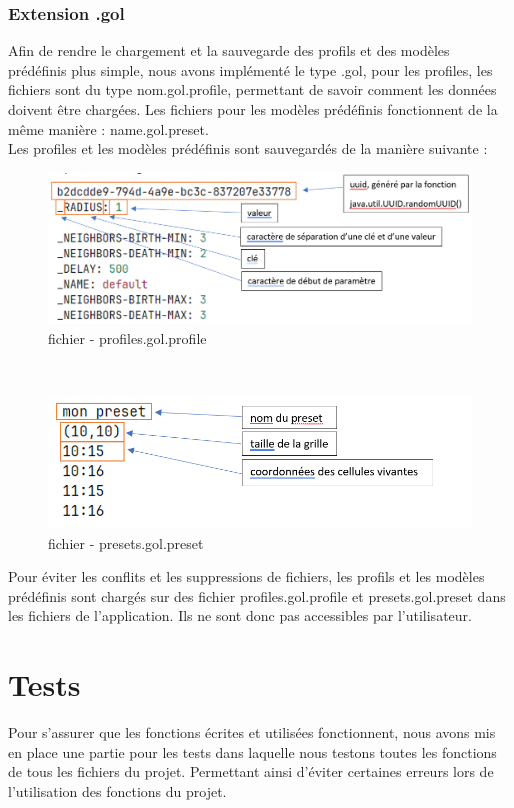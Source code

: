 \documentclass[12pt]{article}
\begin{document}
			\subsubsection{Extension .gol}
			Afin de rendre le chargement et la sauvegarde des profils et des modèles prédéfinis plus simple, nous avons implémenté le type .gol, pour les profiles, les fichiers sont du type nom.gol.profile, permettant de savoir comment les données doivent être chargées. Les fichiers pour les modèles prédéfinis fonctionnent de la même manière : name.gol.preset.\\
			
			Les profiles et les modèles prédéfinis sont sauvegardés de la manière suivante :
			\begin{figure}[!ht]
				\centering
				\includegraphics[width=\textwidth]{images/profiles.png}
				\caption{fichier - profiles.gol.profile}
			\end{figure}\\
			\begin{figure}[!ht]
				\centering
				\includegraphics[width=\textwidth]{images/presets.png}
				\caption{fichier - presets.gol.preset}
			\end{figure}
			
			Pour éviter les conflits et les suppressions de fichiers, les profils et les modèles prédéfinis sont chargés sur des fichier profiles.gol.profile et presets.gol.preset dans les fichiers de l’application. Ils ne sont donc pas accessibles par l’utilisateur.
			
			\section{Tests}
			Pour s’assurer que les fonctions écrites et utilisées fonctionnent, nous avons mis en place une partie pour les tests dans laquelle nous testons toutes les fonctions de tous les fichiers du projet. Permettant ainsi d’éviter certaines erreurs lors de l’utilisation des fonctions du projet.
			
\end{document}
